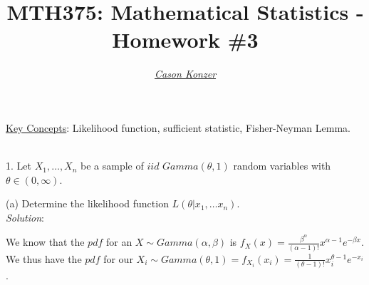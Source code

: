 \documentclass[12pt]{article}
\newcommand{\XB}{\color{black}}
\newcommand{\XBB}{\color{blue}}
\newcommand{\XV}{\color{violet}}
\begin{document}
\title{\textbf{MTH375}: Mathematical Statistics - Homework \#3}
\date{}
\author{\XV\textit{\large{\href{https://github.com/casonk}{Cason Konzer}}}\XB}

\maketitle
\hrulefill
\vfill
    \underline{Key Concepts}: Likelihood function, sufficient statistic, Fisher-Neyman Lemma.

\newpage
\newpage
\XBB\hrulefill\XB \\

1. Let $ X_{1}, \dots , X_{n} $ be a sample of $ iid $ $ Gamma(\theta, 1) $ random variables with $ \theta \in (0, \infty) $. \\

\XBB\hrulefill\XB
\vspace{5mm}


(a) Determine the likelihood function $ L(\theta | x_{1}, \dots x_{n}) $.
\vspace{2.5mm} \\
\textit{Solution}:
\vspace{2.5mm}

\noindent
We know that the $ pdf $ for an $ X \sim Gamma(\alpha, \beta) $ is $ \displaystyle f_{X}(x) = \frac{\beta^{\alpha}}{(\alpha - 1)!}x^{\alpha - 1}e^{-\beta x} $. \\

\noindent
We thus have the $ pdf $ for our $ \displaystyle X_{i} \sim Gamma(\theta, 1) = f_{X_{i}}(x_{i}) = \frac{1}{(\theta - 1)!}x_{i}^{\theta - 1}e^{-x_{i}} $. \\
\end{document}
